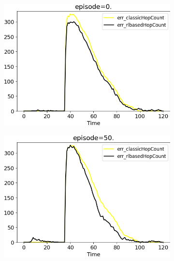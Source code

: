 \documentclass[conference]{IEEEtran}
\begin{document}
\begin{figure}
  \centering
  \begin{subfigure}[b]{0.3\textwidth}
      \centering
      \includegraphics[width=\textwidth]{img/1}
  \end{subfigure}
  \hfill
  \begin{subfigure}[b]{0.3\textwidth}
      \centering
      \includegraphics[width=\textwidth]{img/50}
  \end{subfigure}
  \hfill
  \begin{subfigure}[b]{0.3\textwidth}
      \centering

\end{subfigure}
\end{figure}
\end{document}
